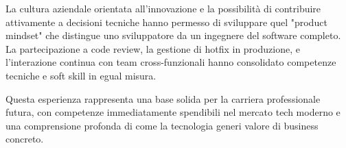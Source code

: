 La cultura aziendale orientata all'innovazione e la possibilità di contribuire attivamente a decisioni tecniche hanno permesso di sviluppare quel "product mindset" che distingue uno sviluppatore da un ingegnere del software completo. La partecipazione a code review, la gestione di hotfix in produzione, e l'interazione continua con team cross-funzionali hanno consolidato competenze tecniche e soft skill in egual misura.

Questa esperienza rappresenta una base solida per la carriera professionale futura, con competenze immediatamente spendibili nel mercato tech moderno e una comprensione profonda di come la tecnologia generi valore di business concreto.